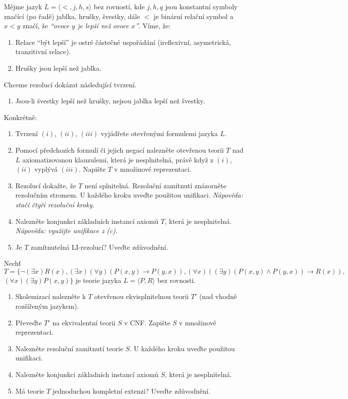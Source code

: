 \documentclass[a4paper,12pt]{article}
\begin{document}
\medskip\begin{problem}
Mějme jazyk $L=\langle <, j, h, s\rangle$ bez rovností, kde $j,h,q$ jsou konstantní symboly značící (po řadě) jablka, hrušky, švestky, dále $<$ je binární relační symbol a $x < y$ značí, že {\it ``ovoce $y$ je lepší než ovoce $x$''}. Víme, že:
\begin{enumerate}[label=(\roman*)]\it
    \item Relace ``být lepší'' je ostré částečné uspořádání (ireflexivní, asymetrická, tranzitivní relace).
    \item Hrušky jsou lepší než jablka.
\end{enumerate}
Chceme rezolucí dokázat následující tvrzení.
\begin{enumerate}[label=(\roman*)]\it
    \setcounter{enumi}{2}
    \item Jsou-li švestky lepší než hrušky, nejsou jablka lepší než švestky.
\end{enumerate}
\smallskip

Konkrétně:
\begin{enumerate}
\item Tvrzení $(i)$, $(ii)$, $(iii)$ vyjádřete otevřenými formulemi jazyka $L$.
\item Pomocí předchozích formulí či jejich negací nalezněte otevřenou teorii $T$ nad $L$ axiomatizovanou klauzulemi, která je nesplnitelná, právě když z $(i)$, $(ii)$ vyplývá $(iii)$. Napište $T$ v množinové reprezentaci.
\item Rezolucí dokažte, že $T$ není splnitelná. Rezoluční zamítnutí znázorněte rezolučním stromem. U každého kroku uveďte použitou unifikaci. {\it Nápověda: stačí čtyři rezoluční kroky.}
\item Nalezněte konjunkci základních instancí axiomů $T$, která je nesplnitelná. {\it Nápověda: využijte unifikace z (c).}
\item Je $T$ zamítnutelná LI-rezolucí? Uveďte zdůvodnění.
\end{enumerate}
\end{problem}


\medskip\begin{problem}
Nechť $T=\{\neg(\exists x) R(x), (\exists x)(\forall y)(P(x,y)\to P(y,x)), (\forall x)((\exists y)(P(x,y)\wedge P(y,x))\to R(x)),$ $(\forall x)(\exists y)P(x,y)\}$ je teorie jazyka $L=\langle P,R\rangle$ bez rovnosti.
\begin{enumerate}
\item Skolemizací nalezněte k $T$ otevřenou ekvisplnitelnou teorii $T'$ (nad vhodně rozšířeným jazykem).
\item Převeďte $T'$ na ekvivalentní teorii $S$ v CNF. Zapište $S$ v množinové reprezentaci.
\item Nalezněte rezoluční zamítnutí teorie $S$. U každého kroku uveďte použitou unifikaci.
\item Nalezněte konjunkci základních instancí axiomů $S$, která je nesplnitelná.
\item Má teorie $T$ jednoduchou kompletní extenzi? Uveďte zdůvodnění.
\end{enumerate}
\end{problem}
\end{document}
